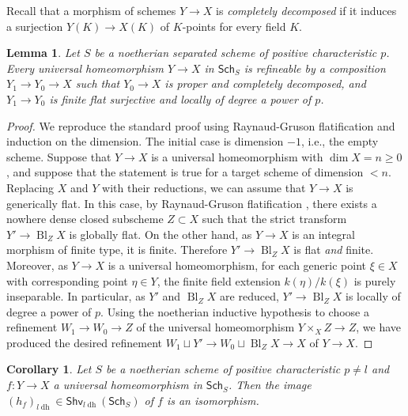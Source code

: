 \documentclass[10pt]{amsart}
\newtheorem{coro}[theo]{Corollary}
\newtheorem{lemm}[theo]{Lemma}
\theoremstyle{definition}
\newcommand{\PreShv}{\mathsf{PreShv}}
\newcommand{\Shv}{\mathsf{Shv}}
\newcommand{\Sch}{\mathsf{Sch}}
\newcommand{\ldh}{{l{\operatorname{dh}}}}
\newcommand{\Bl}{{\operatorname{Bl}}}
\begin{document}
Recall that a morphism of schemes $Y \to X$ is \emph{completely decomposed} if it induces a surjection $Y(K) \to X(K)$ of $K$-points for every field $K$.

\begin{lemm} \label{lemm:uhldh}
Let $S$ be a noetherian separated scheme of positive characteristic $p$. Every universal homeomorphism $Y \to X$ in $\Sch_S$ is refineable by a composition $Y_1 \to Y_0 \to X$ such that $Y_0 \to X$ is proper and completely decomposed, and $Y_1 \to Y_0$ is finite flat surjective and locally of degree a power of $p$.
\end{lemm}

\begin{proof}
We reproduce the standard proof using Raynaud-Gruson flatification and induction on the dimension. The initial case is dimension $-1$, i.e., the empty scheme. Suppose that $Y \to X$ is a universal homeomorphism with $\dim X = n \geq 0$, and suppose that the statement is true for a target scheme of dimension $< n$. Replacing $X$ and $Y$ with their reductions, we can assume that $Y \to X$ is generically flat. In this case, by Raynaud-Gruson flatification \cite[Thm.5.2.2]{RG71}, there exists a nowhere dense closed subscheme $Z \subset X$ such that the strict transform $Y' \to \Bl_Z X$ is globally flat. On the other hand, as $Y \to X$ is an integral morphism of finite type, it is finite. Therefore $Y' \to \Bl_Z X$ is flat \emph{and} finite. Moreover, as $Y \to X$ is a universal homeomorphism, for each generic point $\xi \in X$ with corresponding point $\eta \in Y$, the finite field extension $k(\eta) / k(\xi)$ is purely inseparable. In particular, as $Y'$ and $\Bl_Z X$ are reduced, $Y' \to \Bl_Z X$ is locally of degree a power of $p$. Using the noetherian inductive hypothesis to choose a refinement $W_1 \to W_0 \to Z$ of the universal homeomorphism $Y\times_X Z \to Z$, we have produced the desired refinement $W_1 \sqcup Y' \to W_0 \sqcup \Bl_Z X \to X$ of $Y \to X$.
\end{proof}

\begin{coro} \label{coro:ldhUhIso}
Let $S$ be a noetherian %
scheme of positive characteristic $p \neq l$ and $f: Y \to X$ a universal homeomorphism in $\Sch_S$. Then the image $(h_f)_\ldh \in \Shv_{\ldh}(\Sch_S)$ of $f$ is an isomorphism.%
\end{coro}
\end{document}
